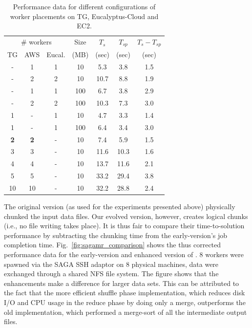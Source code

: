 \documentclass[3p,twocolumn]{elsarticle}
\begin{document}
\begin{table}[h!]
  \footnotesize
  \begin{tabular}{ccccccc}
    \hline
    \multicolumn{3}{c}{\# workers}  &  Size   &  $T_s$  & $T_{sp}$ & $T_s - T_{sp}$\\
    TG &  AWS & Eucal. &  (MB)  & (sec) & (sec) & (sec) \\
    \hline
    - & 1 & 1 & 10   & 5.3 & 3.8 & 1.5\\
    - & 2 & 2 & 10   & 10.7 & 8.8 & 1.9 \\
    - & 1 & 1 & 100  & 6.7 & 3.8 & 2.9\\
    - & 2 & 2 & 100  & 10.3 & 7.3 & 3.0\\
    \hline
    1 & - & 1 & 10   & 4.7 & 3.3 & 1.4\\
    1 & - & 1 & 100  & 6.4 & 3.4 & 3.0\\
    \hline
    {\bf 2} &   {\bf 2} & - & 10 & 7.4 & 5.9 & 1.5 \\
    3 & 3 & - & 10 & 11.6 & 10.3 & 1.6 \\
    4 & 4 & - & 10 & 13.7 & 11.6 & 2.1 \\
    5 & 5 & - & 10 & 33.2 & 29.4 & 3.8 \\
    10 & 10 & - & 10 & 32.2 & 28.8 & 2.4 \\
    \hline
     \hline
  \end{tabular}
  \caption{Performance data for different configurations of worker
  placements on TG, Eucalyptus-Cloud and EC2.
  \label{tab3}}
\end{table}

The original \sagamapreduce version (as used for the experiments
presented above) physically chunked the input data files.  Our evolved
version, however, creates logical chunks (i.e., no file
writing takes place).  It is thus fair to compare their
time-to-solution performance by subtracting the chunking time from the
early-version's job completion time.  Fig.~\ref{fig:sagamr_comparison}
shows the thus corrected performance data for the early-version and
enhanced version of \sagamapreduce.  8 workers were spawned via the
SAGA SSH adaptor on 8 physical machines,  data were exchanged through
a shared NFS file system.  The figure shows that the \sagamapreduce
enhancements make a difference for larger data sets.  This can be
attributed to the fact that the more efficient shuffle phase
implementation, which reduces disk I/O and CPU usage in the reduce
phase by doing only a merge, outperforms the old implementation, which
performed a merge-sort of all the intermediate output files.
\end{document}
